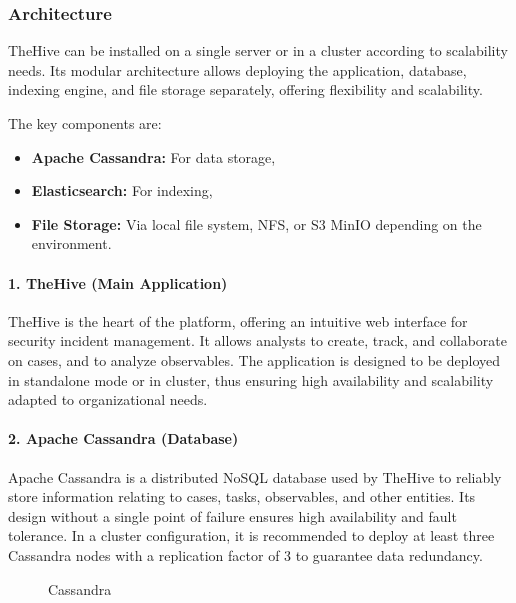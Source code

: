 \subsubsection{Architecture}

TheHive can be installed on a single server or in a cluster according to scalability needs. Its modular architecture allows deploying the application, database, indexing engine, and file storage separately, offering flexibility and scalability.

The key components are:
\begin{itemize}
    \item \textbf{Apache Cassandra:} For data storage,
    \item \textbf{Elasticsearch:} For indexing,
    \item \textbf{File Storage:} Via local file system, NFS, or S3 MinIO depending on the environment.
\end{itemize}

\paragraph{1. TheHive (Main Application)}

TheHive is the heart of the platform, offering an intuitive web interface for security incident management. It allows analysts to create, track, and collaborate on cases, and to analyze observables. The application is designed to be deployed in standalone mode or in cluster, thus ensuring high availability and scalability adapted to organizational needs.

\paragraph{2. Apache Cassandra (Database)}

Apache Cassandra is a distributed NoSQL database used by TheHive to reliably store information relating to cases, tasks, observables, and other entities. Its design without a single point of failure ensures high availability and fault tolerance. In a cluster configuration, it is recommended to deploy at least three Cassandra nodes with a replication factor of 3 to guarantee data redundancy.

\begin{figure}[H]
\centering
{}
\caption{Cassandra}
\label{fig:cassandra}
\end{figure}

